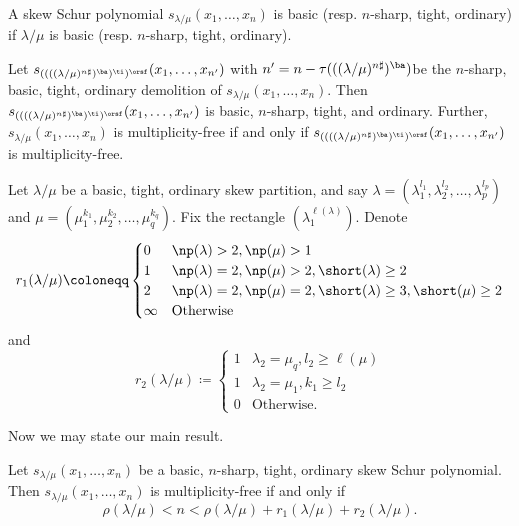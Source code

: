 \begin{defi}
A skew Schur polynomial $s_{\lambda / \mu}(x_1,\ldots,x_n)$ is basic (resp. $n$-sharp, tight, ordinary) if $\lambda / \mu$ is basic (resp. $n$-sharp, tight, ordinary). 
\end{defi}


\begin{theorem} 
\label{theorem:mainReduction}
Let $s_{((((\lambda / \mu)^{n\sharp})^{\ba })^{\ti })^{\orsf}}(x_1,\ldots,x_{n'})$ with $n' = n - \tau(((\lambda / \mu)^{n\sharp})^{\ba })$\break be the $n$-sharp, basic, tight, ordinary demolition of $s_{\lambda / \mu}(x_1,\ldots,x_n)$. Then\break $s_{((((\lambda / \mu)^{n\sharp})^{\ba })^{\ti })^{\orsf}}(x_1,\ldots,x_{n'})$ is basic, $n$-sharp, tight, and ordinary. Further,\break 
$s_{\lambda / \mu}(x_1,\ldots,x_n)$ is multiplicity-free if and only if $s_{((((\lambda / \mu)^{n\sharp})^{\ba })^{\ti })^{\orsf}}(x_1,\ldots,x_{n'})$ is multiplicity-free.
\end{theorem}

\begin{defi}
\label{def:r1andr2}
Let $\lambda/\mu$ be a basic, tight, ordinary skew partition, and say $\lambda = (\lambda_1^{l_1},\lambda_2^{l_2},\ldots,\lambda_p^{l_p})$ and $\mu = (\mu_1^{k_1},\mu_2^{k_2},\ldots,\mu_q^{k_q})$. Fix the rectangle $(\lambda_1^{\ell(\lambda)})$. Denote
\begin{equation}
r_1(\lambda/\mu) \coloneqq \begin{cases}
0 & \np (\lambda)>2, \np (\mu)> 1\\
1 & \np (\lambda)=2, \np (\mu)>2, \short (\lambda)\geq 2\\
2 & \np (\lambda)=2, \np (\mu)=2, \short (\lambda)\geq 3, \short (\mu)\geq 2\\
\infty & \text{Otherwise}
\end{cases}
\end{equation}
and
\begin{equation}
r_2(\lambda/\mu) \coloneqq \begin{cases}
1 & \lambda_2 = \mu_q, l_2 \geq \ell(\mu)\\
1 & \lambda_2 = \mu_1, k_1 \geq l_2\\
0 & \text{Otherwise}.
\end{cases}
\end{equation}
\end{defi}

Now we may state our main result.

\begin{theorem}
\label{theorem:mainResult}
Let $s_{\lambda / \mu}(x_1,\ldots,x_n)$ be a basic, $n$-sharp, tight, ordinary skew Schur polynomial. Then $s_{\lambda / \mu}(x_1,\ldots,x_n)$ is multiplicity-free if and only if
\begin{equation}
\rho(\lambda/\mu) < n < \rho(\lambda/\mu) + r_1(\lambda/\mu)+ r_2(\lambda/\mu).
\end{equation}
\end{theorem}


